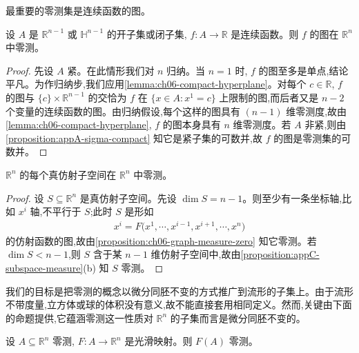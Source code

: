 \documentclass[../../main.tex]{subfiles}
\begin{document}
最重要的零测集是连续函数的图。

\begin{proposition}\label{proposition:ch06-graph-measure-zero}
设 $A$ 是 $\mathbb{R}^{n-1}$ 或 $\mathbb{H}^{n-1}$ 的开子集或闭子集, $f:A\to\mathbb{R}$ 是连续函数。则 $f$ 的图在 $\mathbb{R}^n$ 中零测。
\end{proposition}

\begin{proof}
先设 $A$ 紧。在此情形我们对 $n$ 归纳。当 $n=1$ 时, $f$ 的图至多是单点,结论平凡。为作归纳步,我们应用\cref{lemma:ch06-compact-hyperplane}。对每个 $c\in\mathbb{R}$, $f$ 的图与 $\{c\}\times\mathbb{R}^{n-1}$ 的交恰为 $f$ 在 $\{x\in A:x^1=c\}$ 上限制的图,而后者又是 $n-2$ 个变量的连续函数的图。由归纳假设,每个这样的图具有 $(n-1)$ 维零测度,故由\cref{lemma:ch06-compact-hyperplane}, $f$ 的图本身具有 $n$ 维零测度。若 $A$ 非紧,则由\cref{proposition:appA-sigma-compact} 知它是紧子集的可数并,故 $f$ 的图是零测集的可数并。
\end{proof}

\begin{corollary}\label{corollary:ch06-affine-subspace-measure-zero}
$\mathbb{R}^n$ 的每个真仿射子空间在 $\mathbb{R}^n$ 中零测。
\end{corollary}

\begin{proof}
设 $S\subseteq\mathbb{R}^n$ 是真仿射子空间。先设 $\dim S=n-1$。则至少有一条坐标轴,比如 $x^i$ 轴,不平行于 $S$;此时 $S$ 是形如
\begin{align*}
x^i=F\bigl(x^1,\cdots ,x^{i-1},x^{i+1},\cdots ,x^n\bigr)
\end{align*}
的仿射函数的图,故由\cref{proposition:ch06-graph-measure-zero} 知它零测。若 $\dim S<n-1$,则 $S$ 含于某 $n-1$ 维仿射子空间中,故由\cref{proposition:appC-subspace-measure}(b) 知 $S$ 零测。
\end{proof}

我们的目标是把零测的概念以微分同胚不变的方式推广到流形的子集上。由于流形不带度量,立方体或球的体积没有意义,故不能直接套用相同定义。然而,关键由下面的命题提供,它蕴涵零测这一性质对 $\mathbb{R}^n$ 的子集而言是微分同胚不变的。

\begin{proposition}\label{proposition:ch06-zero-measure-smooth-image}
设 $A\subseteq\mathbb{R}^n$ 零测, $F:A\to\mathbb{R}^n$ 是光滑映射。则 $F(A)$ 零测。
\end{proposition}
\end{document}
